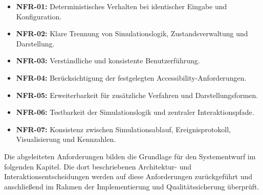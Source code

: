 \begin{itemize}
    \item \textbf{NFR-01:} Deterministisches Verhalten bei identischer Eingabe und Konfiguration.
    \item \textbf{NFR-02:} Klare Trennung von Simulationslogik, Zustandsverwaltung und Darstellung.
    \item \textbf{NFR-03:} Verständliche und konsistente Benutzerführung.
    \item \textbf{NFR-04:} Berücksichtigung der festgelegten Accessibility-Anforderungen.
    \item \textbf{NFR-05:} Erweiterbarkeit für zusätzliche Verfahren und Darstellungsformen.
    \item \textbf{NFR-06:} Testbarkeit der Simulationslogik und zentraler Interaktionspfade.
    \item \textbf{NFR-07:} Konsistenz zwischen Simulationsablauf, Ereignisprotokoll, Visualisierung und Kennzahlen.
\end{itemize}

Die abgeleiteten Anforderungen bilden die Grundlage für den Systementwurf im folgenden Kapitel. Die dort beschriebenen Architektur- und Interaktionsentscheidungen werden auf diese Anforderungen zurückgeführt und anschließend im Rahmen der Implementierung und Qualitätssicherung überprüft.